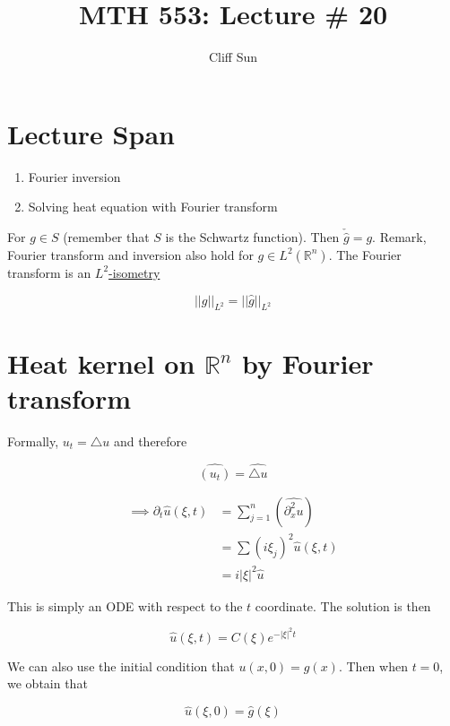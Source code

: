 \documentclass{article}
\title{MTH 553: Lecture \# 20}
\author{Cliff Sun}
\newtheorem{one minute paper}[theorem]{One Minute Paper}
\begin{document}
\maketitle

\section*{Lecture Span}
\begin{enumerate}
    \item Fourier inversion
    \item Solving heat equation with Fourier transform
\end{enumerate}

For $g \in S$ (remember that $S$ is the Schwartz function). Then $\check{\hat{g}} = g$. Remark, Fourier transform and inversion also hold for $g \in L^2(\mathbb{R}^n)$. The Fourier transform is an 
\underline{$L^2$-isometry} 

\begin{equation}
    ||g||_{L^2} = ||\hat{g}||_{L^2}
\end{equation}


\section*{Heat kernel on $\mathbb{R}^n$ by Fourier transform}

Formally, $u_t = \triangle u$ and therefore 

\begin{equation}
    \hat{(u_t)} = \hat{\triangle u}
\end{equation}

\begin{align*}
    \implies \partial_t \hat{u}(\xi, t) &= \sum_{j=1}^n \left( \hat{\partial^2_x u} \right) \\
    &= \sum (i\xi_j)^{2}\hat{u}(\xi,t) \\
    &= i|\xi|^2 \hat{u}
\end{align*}

This is simply an ODE with respect to the $t$ coordinate. The solution is then 

\begin{equation}
    \hat{u}(\xi,t) = C(\xi)e^{-|\xi|^2 t}
\end{equation}

We can also use the initial condition that $u(x,0) = g(x)$. Then when $t=0$, we obtain that 

\begin{equation}
    \hat{u}(\xi,0) = \hat{g}(\xi)
\end{equation}
\end{document}
